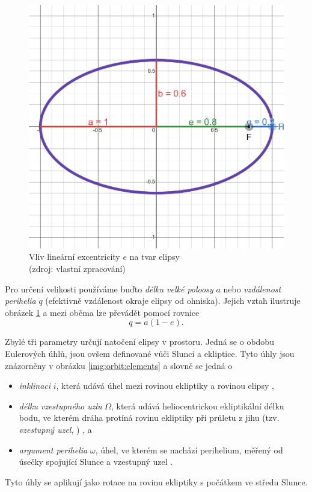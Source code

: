 \begin{figure}[ht]
    \includegraphics[width=0.5\linewidth]{img/ellipse/ellipse-e08.png}
    \caption[Vliv lineární excentricity $e$ na tvar elipsy]{Vliv lineární excentricity $e$ na tvar elipsy\\{\small (zdroj: vlastní zpracování)}}
    \label{img:orbit:ellipse}
\end{figure}

Pro určení velikosti používáme buďto \textit{délku velké poloosy} $a$ nebo \textit{vzdálenost perihelia} $q$ (efektivně vzdálenost okraje elipsy od ohniska). Jejich vztah ilustruje obrázek \ref{img:orbit:ellipse} a mezi oběma lze převádět pomocí rovnice \cite{ceplecha}
$$
    q=a(1-e)\text{.}
$$

\smallskip

Zbylé tři parametry určují natočení elipsy v prostoru. Jedná se o obdobu Eulerových úhlů, jsou ovšem definované vůči Slunci a ekliptice. Tyto úhly jsou znázorněny v obrázku \ref{img:orbit:elements} a slovně se jedná o
\begin{itemize}
    \item \textit{inklinaci} $i$, která udává úhel mezi rovinou ekliptiky a rovinou elipsy \cite{astro},
    \item \textit{délku vzestupného uzlu} $\Omega$, která udává heliocentrickou ekliptikální délku bodu, ve kterém dráha protíná rovinu ekliptiky při průletu z jihu (tzv. \textit{vzestupný uzel}, \NorthNode) \cite{astro}, a
    \item \textit{argument perihelia} $\omega$, úhel, ve kterém se nachází perihelium, měřený od úsečky spojující Slunce a vzestupný uzel \cite{astro}.
\end{itemize}
Tyto úhly se aplikují jako rotace na rovinu ekliptiky s počátkem ve středu Slunce.

